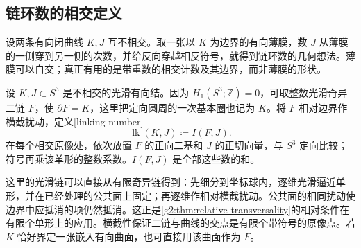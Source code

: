 \subsection{链环数的相交定义}
\label{g2:subsec:A01:03}

设两条有向闭曲线 \(K,J\) 互不相交。取一张以 \(K\) 为边界的有向薄膜，数 \(J\) 从薄膜的一侧穿到另一侧的次数，并给反向穿越相反符号，就得到链环数的几何想法。薄膜可以自交；真正有用的是带重数的相交计数及其边界，而非薄膜的形状。

\begin{definition}\label{g2:def:linking-number}
	设 \(K,J\subset S^3\) 是不相交的光滑有向结。因为 \(H_1(S^3;\mathbb Z)=0\)，可取整数光滑奇异二链 \(F\)，使 \(\partial F=K\)，这里把定向圆周的一次基本圈也记为 \(K\)。将 \(F\) 相对边界作横截扰动，定义[linking number]
	\[
		\operatorname{lk}(K,J)\coloneqq I(F,J).
	\]
	在每个相交原像处，依次放置 \(F\) 的正向二基和 \(J\) 的正切向量，与 \(S^3\) 定向比较；符号再乘该单形的整数系数。\(I(F,J)\) 是全部这些数的和。
\end{definition}

这里的光滑链可以直接从有限奇异链得到：先细分到坐标球内，逐维光滑逼近单形，并在已经处理的公共面上固定；再逐维作相对横截扰动。公共面的相同扰动使边界中应抵消的项仍然抵消。这正是\cref{g2:thm:relative-transversality}的相对条件在有限个单形上的应用。横截性保证二链与曲线的交点是有限个带符号的原像点。若 \(K\) 恰好界定一张嵌入有向曲面，也可直接用该曲面作为 \(F\)。

